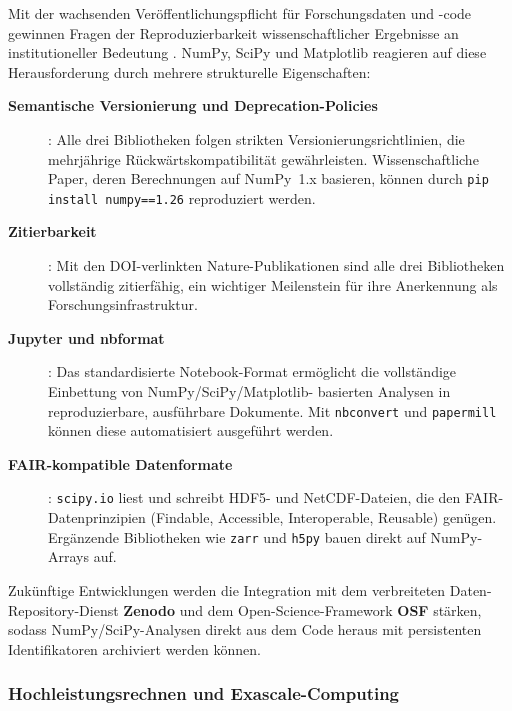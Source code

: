 \documentclass[12pt, a4paper]{article}
\begin{document}
Mit der wachsenden Veröffentlichungspflicht für Forschungsdaten und
-code gewinnen Fragen der Reproduzierbarkeit wissenschaftlicher Ergebnisse
an institutioneller Bedeutung \cite{donoho2010invitation, peng2011reproducible}.
NumPy, SciPy und Matplotlib reagieren auf diese Herausforderung durch
mehrere strukturelle Eigenschaften:

\begin{description}
  \item[\textbf{Semantische Versionierung und Deprecation-Policies}]:
    Alle drei Bibliotheken folgen strikten Versionierungsrichtlinien, die
    mehrjährige Rückwärtskompatibilität gewährleisten. Wissenschaftliche
    Paper, deren Berechnungen auf NumPy~1.x basieren, können durch
    \texttt{pip install numpy==1.26} reproduziert werden.

  \item[\textbf{Zitierbarkeit}]: Mit den DOI-verlinkten Nature-Publikationen
    \cite{harris2020array, virtanen2020scipy, hunter2007matplotlib} sind
    alle drei Bibliotheken vollständig zitierfähig, ein wichtiger Meilenstein
    für ihre Anerkennung als Forschungsinfrastruktur.

  \item[\textbf{Jupyter und nbformat}]: Das standardisierte Notebook-Format
    ermöglicht die vollständige Einbettung von NumPy/SciPy/Matplotlib-
    basierten Analysen in reproduzierbare, ausführbare Dokumente. Mit
    \texttt{nbconvert} und \texttt{papermill} können diese automatisiert
    ausgeführt werden.

  \item[\textbf{FAIR-kompatible Datenformate}]: \texttt{scipy.io} liest und
    schreibt HDF5- und NetCDF-Dateien, die den FAIR-Datenprinzipien
    (Findable, Accessible, Interoperable, Reusable) genügen.
    Ergänzende Bibliotheken wie \texttt{zarr} und \texttt{h5py} bauen
    direkt auf NumPy-Arrays auf.
\end{description}

Zukünftige Entwicklungen werden die Integration mit dem verbreiteten
Daten-Repository-Dienst \textbf{Zenodo} und dem Open-Science-Framework
\textbf{OSF} stärken, sodass NumPy/SciPy-Analysen direkt aus dem Code
heraus mit persistenten Identifikatoren archiviert werden können.

\subsubsection{Hochleistungsrechnen und Exascale-Computing}
\label{subsubsec:hpc}
\end{document}

